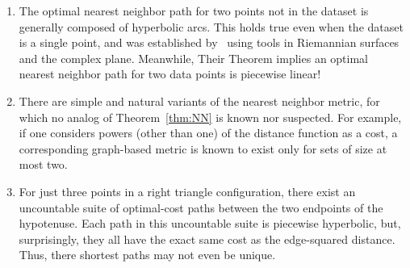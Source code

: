 \begin{enumerate}

\item The optimal nearest neighbor path for two points not in the dataset
is generally composed of hyperbolic arcs.
This holds true even when the dataset is a single point, and was established by~\cite{cohen15approximating} using tools in Riemannian surfaces and the complex plane.
Meanwhile, Their Theorem implies an optimal nearest neighbor path for two data points is piecewise linear!

\item There are simple and natural variants of the nearest neighbor metric, for which no analog of Theorem~\ref{thm:NN} is known nor suspected.
For example, if one considers powers (other than one) of the distance function as a cost, a corresponding graph-based metric is known to exist only for sets of size at most two.

\item For just three points in a right triangle configuration, there exist an uncountable suite of optimal-cost paths between the two endpoints of the hypotenuse.
Each path in this uncountable suite is piecewise hyperbolic, but, surprisingly, they all have the exact same cost as the edge-squared distance.
Thus, there shortest paths may not even be unique.



\end{enumerate}
